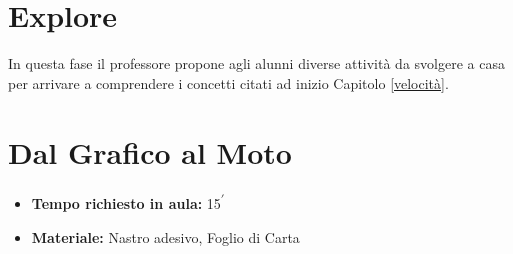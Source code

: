 \documentclass{report} \usepackage[T1]{fontenc} \usepackage[italian]{babel}
\begin{document}
\section{Explore}
In questa fase il professore propone agli alunni diverse attività da svolgere a
casa per arrivare a comprendere i concetti citati ad inizio Capitolo
\ref{velocità}.

\section{Dal Grafico al Moto}

\begin{itemize}
\item \textbf{Tempo richiesto in aula:} 15\textsuperscript{$\prime$}
\item \textbf{Materiale:} Nastro adesivo, Foglio di Carta
\end{itemize}
\end{document}
